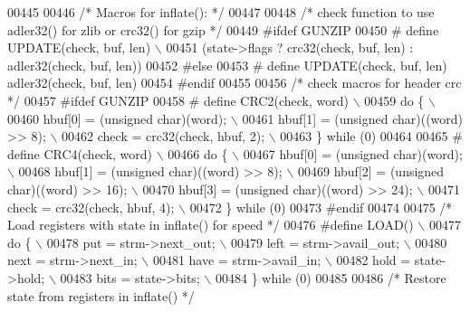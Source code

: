 \begin{DoxyCode}
{{{{00445 
00446 \textcolor{comment}{/* Macros for inflate(): */}
00447 
00448 \textcolor{comment}{/* check function to use adler32() for zlib or crc32() for gzip */}
00449 \textcolor{preprocessor}{#ifdef GUNZIP}
00450 \textcolor{preprocessor}{#  define UPDATE(check, buf, len) \(\backslash\)}
00451 \textcolor{preprocessor}{    (state->flags ? crc32(check, buf, len) : adler32(check, buf, len))}
00452 \textcolor{preprocessor}{#else}
00453 \textcolor{preprocessor}{#  define UPDATE(check, buf, len) adler32(check, buf, len)}
00454 \textcolor{preprocessor}{#endif}
00455 
00456 \textcolor{comment}{/* check macros for header crc */}
00457 \textcolor{preprocessor}{#ifdef GUNZIP}
00458 \textcolor{preprocessor}{#  define CRC2(check, word) \(\backslash\)}
00459 \textcolor{preprocessor}{    do \{ \(\backslash\)}
00460 \textcolor{preprocessor}{        hbuf[0] = (unsigned char)(word); \(\backslash\)}
00461 \textcolor{preprocessor}{        hbuf[1] = (unsigned char)((word) >> 8); \(\backslash\)}
00462 \textcolor{preprocessor}{        check = crc32(check, hbuf, 2); \(\backslash\)}
00463 \textcolor{preprocessor}{    \} while (0)}
00464 
00465 \textcolor{preprocessor}{#  define CRC4(check, word) \(\backslash\)}
00466 \textcolor{preprocessor}{    do \{ \(\backslash\)}
00467 \textcolor{preprocessor}{        hbuf[0] = (unsigned char)(word); \(\backslash\)}
00468 \textcolor{preprocessor}{        hbuf[1] = (unsigned char)((word) >> 8); \(\backslash\)}
00469 \textcolor{preprocessor}{        hbuf[2] = (unsigned char)((word) >> 16); \(\backslash\)}
00470 \textcolor{preprocessor}{        hbuf[3] = (unsigned char)((word) >> 24); \(\backslash\)}
00471 \textcolor{preprocessor}{        check = crc32(check, hbuf, 4); \(\backslash\)}
00472 \textcolor{preprocessor}{    \} while (0)}
00473 \textcolor{preprocessor}{#endif}
00474 
00475 \textcolor{comment}{/* Load registers with state in inflate() for speed */}
00476 \textcolor{preprocessor}{#define LOAD() \(\backslash\)}
00477 \textcolor{preprocessor}{    do \{ \(\backslash\)}
00478 \textcolor{preprocessor}{        put = strm->next\_out; \(\backslash\)}
00479 \textcolor{preprocessor}{        left = strm->avail\_out; \(\backslash\)}
00480 \textcolor{preprocessor}{        next = strm->next\_in; \(\backslash\)}
00481 \textcolor{preprocessor}{        have = strm->avail\_in; \(\backslash\)}
00482 \textcolor{preprocessor}{        hold = state->hold; \(\backslash\)}
00483 \textcolor{preprocessor}{        bits = state->bits; \(\backslash\)}
00484 \textcolor{preprocessor}{    \} while (0)}
00485 
00486 \textcolor{comment}{/* Restore state from registers in inflate() */}
}}}}
\end{DoxyCode}
